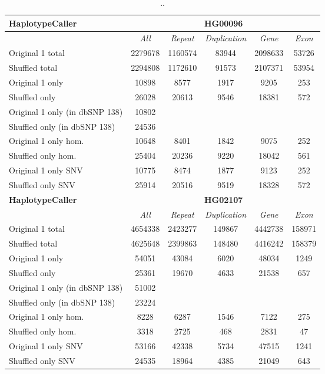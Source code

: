 \begin{table}[htb]
\begin{center}
\begin{tabular}{|l|c||c|c|c|c|}
\hline
{\bf HaplotypeCaller} & \multicolumn{5}{|c|}{\bf HG00096} \\
\hline
\cline{2-6}
{\bf} & {\it All} & {\it Repeat} & {\it Duplication} & {\it Gene} & {\it Exon} \\
\hline
Original 1 total & 2279678 & 1160574 & 83944 & 2098633 & 53726\\ 
\hline
Shuffled total & 2294808 & 1172610 & 91573 & 2107371 & 53954\\ 
\hline
Original 1 only & 10898 & 8577 & 1917 & 9205 & 253\\ 
\hline
Shuffled only & 26028 & 20613 & 9546 & 18381 & 572\\ 
\hline
Original 1 only (in dbSNP 138) & 10802 &  &  &  & \\ 
\hline
Shuffled only (in dbSNP 138) & 24536 &  &  &  & \\ 
\hline
Original 1 only hom. & 10648 & 8401 & 1842 & 9075 & 252\\ 
\hline
Shuffled only hom. & 25404 & 20236 & 9220 & 18042 & 561\\ 
\hline
Original 1 only SNV & 10775 & 8474 & 1877 & 9123 & 252\\ 
\hline
Shuffled only SNV & 25914 & 20516 & 9519 & 18328 & 572\\ 
\hline
\hline
{\bf HaplotypeCaller} & \multicolumn{5}{|c|}{\bf HG02107} \\
\hline
\cline{2-6}
{\bf} & {\it All} & {\it Repeat} & {\it Duplication} & {\it Gene} & {\it Exon} \\
\hline
Original 1 total & 4654338 & 2423277 & 149867 & 4442738 & 158971\\ 
\hline
Shuffled total & 4625648 & 2399863 & 148480 & 4416242 & 158379\\ 
\hline
Original 1 only & 54051 & 43084 & 6020 & 48034 & 1249\\ 
\hline
Shuffled only & 25361 & 19670 & 4633 & 21538 & 657\\ 
\hline
Original 1 only (in dbSNP 138) & 51002 &  &  &  & \\ 
\hline
Shuffled only (in dbSNP 138) & 23224 &  &  &  & \\ 
\hline
Original 1 only hom. & 8228 & 6287 & 1546 & 7122 & 275\\ 
\hline
Shuffled only hom. & 3318 & 2725 & 468 & 2831 & 47\\ 
\hline
Original 1 only SNV & 53166 & 42338 & 5734 & 47515 & 1241\\ 
\hline
Shuffled only SNV & 24535 & 18964 & 4385 & 21049 & 643\\ 
\hline 
\end{tabular}
\end{center}
\caption{ .. }
\label{tab:orig-vs-shuf-hc}
\end{table}



